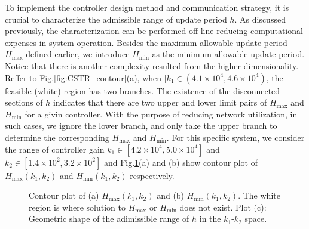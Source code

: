 \documentclass[letterpaper, 10 pt, conference]{ieeeconf}\IEEEoverridecommandlockouts%
\begin{document}
To implement the controller design method and communication strategy, it is crucial to characterize the admissible range of update period $h$. As discussed previously, the characterization can be performed off-line reducing computational expenses in system operation. Besides the maximum allowable update period $H_{\max}$ defined earlier, we introduce $H_{\min}$ as the minimum allowable update period. Notice that there is another complexity resulted from the higher dimensionality. Reffer to Fig.\ref{fig:CSTR_contour}(a), when $[k_1 \in (4.1\times 10^4, 4.6\times 10^4)$, the feasible (white) region has two branches. The existence of the disconnected sections of $h$ indicates that there are two upper and lower limit pairs of $H_{\max}$ and $H_{\min}$ for a givin controller. With the purpose of reducing network utilization, in such cases, we ignore the lower branch, and only take the upper branch to determine the corresponding $H_{\max}$ and $H_{\min}$. For this specific system, we consider the range of controller gain $k_1 \in [4.2\times 10^4, 5.0\times 10^4]$ and $k_2\in [1.4\times 10^2, 3.2\times 10^2]$ and Fig.\ref{fig:HmaxHmin}(a) and (b) show contour plot of $H_{\max}(k_1,k_2)$ and $H_{\min}(k_1,k_2)$ respectively.

\begin{figure}[hptb]
  \centerline{\hspace{2mm}\hspace{-4mm}{\footnotesize (a)}
  \hspace{-4mm}{\footnotesize (b)}}
  \centerline{\hspace{-4mm}{\footnotesize (c)}}
  \caption{Contour plot of (a) $H_{\max}(k_1,k_2)$ and (b) $H_{\min}(k_1,k_2)$. The white region is where solution to $H_{\max}$ or $H_{\min}$ does not exist. Plot (c): Geometric shape of the adimissible range of $h$ in the $k_1$-$k_2$ space.}
  \label{fig:HmaxHmin}
\end{figure}
\end{document}
